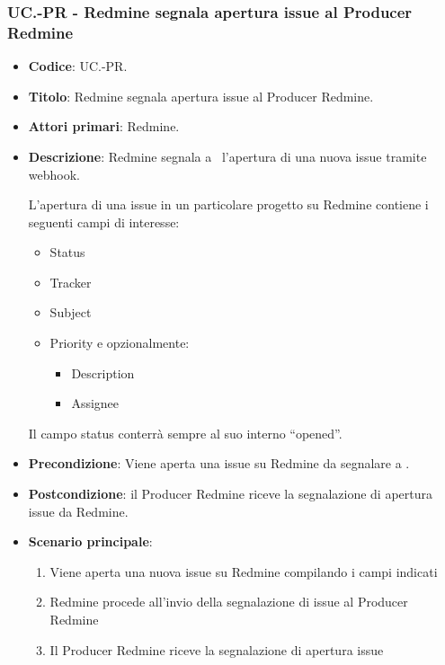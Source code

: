 \subsubsection{UC\theuccount.\thesubuccount-PR - Redmine segnala apertura issue al Producer Redmine}
\begin{itemize}
	\item \textbf{Codice}: UC\theuccount.\thesubuccount-PR.
	\item \textbf{Titolo}: Redmine segnala apertura issue al Producer Redmine.
	\item \textbf{Attori primari}: Redmine.
	\item \textbf{Descrizione}: Redmine segnala a \progetto\ l'apertura di una nuova issue tramite webhook.
	
	L'apertura di una issue in un particolare progetto su Redmine contiene i seguenti campi di interesse:
	\begin{itemize}
		\item Status
		\item Tracker
		\item Subject
		\item Priority e opzionalmente:
		\begin{itemize}
			\item Description
			\item Assignee
		\end{itemize}
	\end{itemize}
	Il campo status conterrà sempre al suo interno ``opened''.
	\item \textbf{Precondizione}: Viene aperta una issue su Redmine da
	segnalare a \progetto.
	\item \textbf{Postcondizione}: il Producer Redmine riceve la segnalazione di apertura issue da Redmine.
	\item \textbf{Scenario principale}: 
	\begin{enumerate}
		\item Viene aperta una nuova issue su Redmine compilando i campi indicati
		\item Redmine procede all'invio della segnalazione di issue al Producer Redmine
        \item Il Producer Redmine riceve la segnalazione di apertura issue
	\end{enumerate}
	
\end{itemize}

